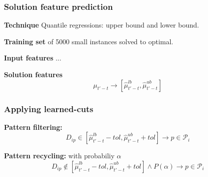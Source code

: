 \begin{frame}
\frametitle{\textbf{Solution feature prediction}}

  \begin{block}{\textbf{Technique}}
    Quantile regressions: upper bound and lower bound.
  \end{block}

  \begin{block}{\textbf{Training set}}
    of 5000 small instances solved to optimal.
  \end{block}

  \begin{block}{\textbf{Input features}}
    ...
  \end{block}

  \begin{block}{\textbf{Solution features}}
    \begin{equation*}
      \mu_{t'-t} \to [\hat{\mu}_{t'-t}^{lb}, \hat{\mu}_{t'-t}^{ub}]
   \end{equation*}
  \end{block}

\end{frame}

\begin{frame}
\frametitle{\textbf{Applying learned-cuts}}

  \begin{block}{\textbf{Pattern filtering:}}
    \begin{equation*}
      D_{ip} \in [\hat{\mu}_{t'-t}^{lb} - tol, \hat{\mu}_{t'-t}^{ub} + tol] \rightarrow p \in \mathcal{P}_i 
    \end{equation*}
  \end{block}

  \begin{block}{\textbf{Pattern recycling:} with probabiliy $\alpha$}
    \begin{equation*}
      D_{ip} \notin [\hat{\mu}_{t'-t}^{lb} - tol, \hat{\mu}_{t'-t}^{ub} + tol] \land P(\alpha)  \rightarrow p \in \mathcal{P}_i 
    \end{equation*}
  \end{block}


\end{frame}

